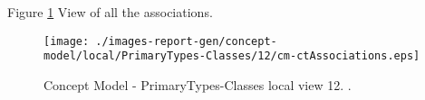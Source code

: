 Figure \ref{fig:lu.uni.lassy.excalibur.group09.spec-CM-view-local-PrimaryTypes-Classes-12} View of all the associations.



\begin{figure}[htbp] 
\label{fig:lu.uni.lassy.excalibur.group09.spec-CM}
\begin{center}
\texttt{[image: ./images-report-gen/concept-model/local/PrimaryTypes-Classes/12/cm-ctAssociations.eps]}
\end{center}
\caption[Concept Model - PrimaryTypes-Classes local view 12 - ]{Concept Model - PrimaryTypes-Classes local view 12. .}
\label{fig:lu.uni.lassy.excalibur.group09.spec-CM-view-local-PrimaryTypes-Classes-12}
\end{figure}
\vspace{0.5cm} 
